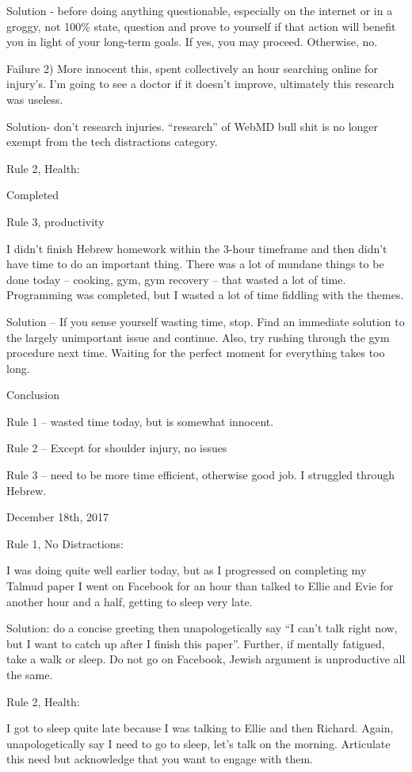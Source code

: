 Solution - before doing anything questionable, especially on the
internet or in a groggy, not 100\% state, question and prove to yourself
if that action will benefit you in light of your long-term goals. If
yes, you may proceed. Otherwise, no.

Failure 2) More innocent this, spent collectively an hour searching
online for injury's. I'm going to see a doctor if it doesn't improve,
ultimately this research was useless.

Solution- don't research injuries. ``research'' of WebMD bull shit is no
longer exempt from the tech distractions category.

Rule 2, Health:

Completed

Rule 3, productivity

I didn't finish Hebrew homework within the 3-hour timeframe and then
didn't have time to do an important thing. There was a lot of mundane
things to be done today -- cooking, gym, gym recovery -- that wasted a
lot of time. Programming was completed, but I wasted a lot of time
fiddling with the themes.

Solution -- If you sense yourself wasting time, stop. Find an immediate
solution to the largely unimportant issue and continue. Also, try
rushing through the gym procedure next time. Waiting for the perfect
moment for everything takes too long.

Conclusion

Rule 1 -- wasted time today, but is somewhat innocent.

Rule 2 -- Except for shoulder injury, no issues

Rule 3 -- need to be more time efficient, otherwise good job. I
struggled through Hebrew.

\bigskip
\bigskip
December 18th, 2017

Rule 1, No Distractions:

I was doing quite well earlier today, but as I progressed on completing
my Talmud paper I went on Facebook for an hour than talked to Ellie and
Evie for another hour and a half, getting to sleep very late.

Solution: do a concise greeting then unapologetically say ``I can't talk
right now, but I want to catch up after I finish this paper''. Further,
if mentally fatigued, take a walk or sleep. Do not go on Facebook,
Jewish argument is unproductive all the same.

Rule 2, Health:

I got to sleep quite late because I was talking to Ellie and then
Richard. Again, unapologetically say I need to go to sleep, let's talk
on the morning. Articulate this need but acknowledge that you want to
engage with them.

